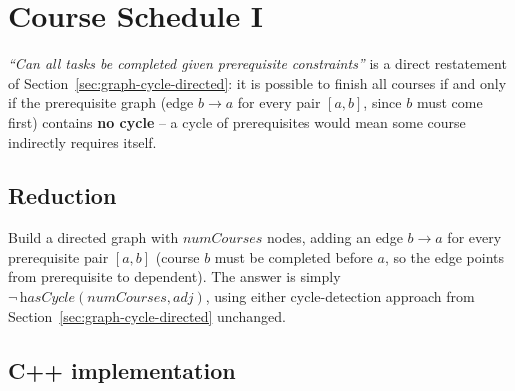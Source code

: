 \section{Course Schedule I}
\label{sec:graph-course-schedule-1}


\begin{patternbox}
\emph{``Can all tasks be completed given prerequisite constraints''} is
a direct restatement of Section~\ref{sec:graph-cycle-directed}: it is
possible to finish all courses if and only if the prerequisite graph
(edge $b \to a$ for every pair $[a,b]$, since $b$ must come first)
contains \textbf{no cycle} -- a cycle of prerequisites would mean some
course indirectly requires itself.
\end{patternbox}

\subsection*{Reduction}

Build a directed graph with $\textit{numCourses}$ nodes, adding an edge
$b \to a$ for every prerequisite pair $[a,b]$ (course $b$ must be
completed before $a$, so the edge points from prerequisite to
dependent). The answer is simply
$\neg\,\textit{hasCycle}(\textit{numCourses}, \textit{adj})$, using
either cycle-detection approach from Section~\ref{sec:graph-cycle-directed}
unchanged.

\subsection*{C++ implementation}


